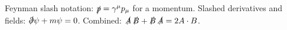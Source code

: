 \documentclass{article}
\begin{document}
Feynman slash notation: $\slashed{p} = \gamma^\mu p_\mu$ for a momentum.
Slashed derivatives and fields: $\slashed{\partial}\psi + m\psi = 0$.
Combined: $\slashed{A}\,\slashed{B} + \slashed{B}\,\slashed{A} = 2A\cdot B$.
\end{document}
